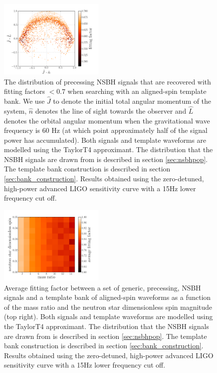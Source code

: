 \begin{figure}
\begin{center}
\includegraphics[width=0.45\textwidth]
{papers/nsbh_effectualness/figure12.pdf}
\end{center}
\caption{\label{fig:arseofsauron}
The distribution of precessing NSBH signals that are recovered with fitting
factors $< 0.7$ when searching with an aligned-spin template bank. We use
$\hat{J}$ to denote the initial total angular momentum of the system, $\hat{n}$
denotes the line of sight towards the observer
and $\hat{L}$ denotes the orbital angular momentum when the gravitational wave frequency is 60 Hz 
(at which point approximately half of the signal power has accumulated). 
Both signals and template waveforms are modelled using the TaylorT4 approximant.
The distribution that the NSBH signals are drawn from
is described in section \ref{sec:nsbhpop}. The template bank construction
is described in section \ref{sec:bank_construction}. Results obtained
using the zero-detuned, high-power advanced LIGO sensitivity curve with a 15Hz
lower frequency cut off.
}
\end{figure}

\begin{figure}
\begin{center}
\includegraphics[width=0.45\textwidth]
{papers/nsbh_effectualness/figure13.pdf}
\end{center}
\caption{\label{fig:nsspin}
Average fitting factor between a set of generic, precessing, NSBH
signals and a template bank of aligned-spin waveforms as a function of the
mass ratio and the neutron star dimensionless spin
magnitude (top right). Both signals and
template waveforms are modelled using the TaylorT4 approximant.
The distribution that the NSBH signals are drawn from
is described in section \ref{sec:nsbhpop}. The template bank construction
is described in section \ref{sec:bank_construction}. Results obtained
using the zero-detuned, high-power advanced LIGO sensitivity curve with a 15Hz
lower frequency cut off.
}
\end{figure}


